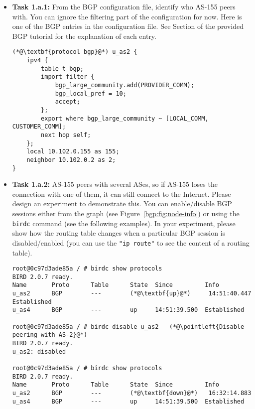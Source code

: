 \begin{itemize}
  \item \textbf{Task 1.a.1:} From the BGP configuration file, identify who
    AS-155 peers with. You can ignore the filtering
    part of the configuration for now. Here is one of the
    BGP entries in the configuration file. See Section \bgppeering 
    of the provided BGP tutorial for the explanation of each entry.
    
\begin{lstlisting}
(*@\textbf{protocol bgp}@*) u_as2 {
    ipv4 {
        table t_bgp;
        import filter {
            bgp_large_community.add(PROVIDER_COMM);
            bgp_local_pref = 10;
            accept;
        };
        export where bgp_large_community ~ [LOCAL_COMM, CUSTOMER_COMM];
        next hop self;
    };
    local 10.102.0.155 as 155;
    neighbor 10.102.0.2 as 2;
}
\end{lstlisting}
     

  \item \textbf{Task 1.a.2:} AS-155 peers with several ASes, so if AS-155
    loses the connection with one of them, it can still connect
    to the Internet. Please design an experiment to 
    demonstrate this. You can enable/disable BGP sessions
    either from the graph (see Figure~\ref{bgp:fig:node-info}) or
    using the \texttt{birdc} command (see the following examples). 
    In your experiment, please show how the routing table changes when a particular 
    BGP session is disabled/enabled (you can use the \texttt{"ip route"} to 
    see the content of a routing table). 


\begin{lstlisting}
root@0c97d3ade85a / # birdc show protocols
BIRD 2.0.7 ready.
Name       Proto      Table      State  Since         Info
u_as2      BGP        ---        (*@\textbf{up}@*)     14:51:40.447  Established
u_as4      BGP        ---        up     14:51:39.500  Established

root@0c97d3ade85a / # birdc disable u_as2   (*@\pointleft{Disable peering with AS-2}@*) 
BIRD 2.0.7 ready.
u_as2: disabled

root@0c97d3ade85a / # birdc show protocols
BIRD 2.0.7 ready.
Name       Proto      Table      State  Since         Info
u_as2      BGP        ---        (*@\textbf{down}@*)   16:32:14.883
u_as4      BGP        ---        up     14:51:39.500  Established
\end{lstlisting}

\end{itemize}


